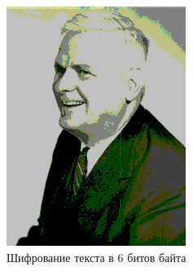 \documentclass[10pt,a4paper,final]{article} %
\begin{document}
\begin{figure}[h!]
	\centering
	\begin{minipage}{0.3\textwidth}
		\centering
		\includegraphics[width=\linewidth]{img/Haskell_6}
		\caption{Шифрование текста в 6 битов байта}
	\end{minipage}
	\hspace{0.02\textwidth}
	\begin{minipage}{0.3\textwidth}
		\centering

\end{minipage}
\end{figure}
\end{document}
